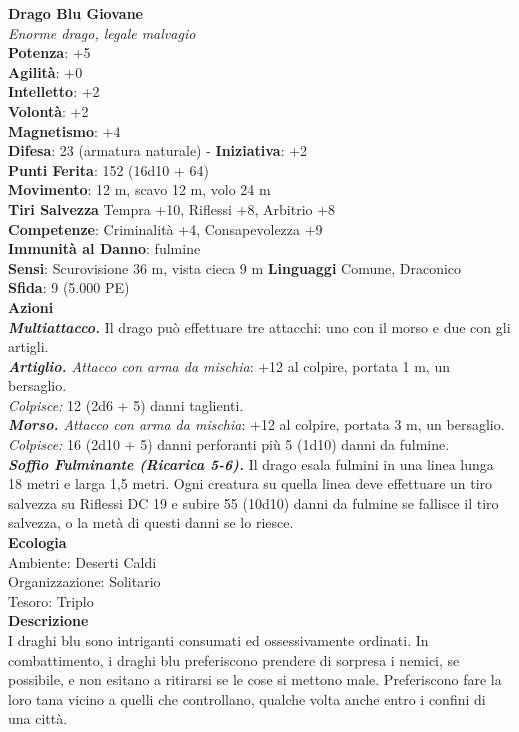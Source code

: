 \begin{multicols}{2}
\medskip\textbf{Drago Blu Giovane}\\
\emph{Enorme drago, legale malvagio}\\
\textbf{Potenza}: +5\\
\textbf{Agilità}: +0\\
\textbf{Intelletto}: +2\\
\textbf{Volontà}: +2\\
\textbf{Magnetismo}: +4\\
\textbf{Difesa}: 23 (armatura naturale) - \textbf{Iniziativa}: +2\\
\textbf{Punti Ferita}: 152 (16d10 + 64)\\
\textbf{Movimento}: 12 m, scavo 12 m, volo 24 m\\
\textbf{Tiri Salvezza} Tempra +10, Riflessi +8, Arbitrio +8\\
\textbf{Competenze}: Criminalità +4, Consapevolezza +9\\
\textbf{Immunità al Danno}: fulmine\\
\textbf{Sensi}: Scurovisione 36 m, vista cieca 9 m
\textbf{Linguaggi} Comune, Draconico\\
\textbf{Sfida}: 9 (5.000 PE)\smallskip\\
\smallskip\textbf{Azioni}\\
\emph{\textbf{Multiattacco.}} Il drago può effettuare tre attacchi: uno con il morso e due con gli artigli.\\
\emph{\textbf{Artiglio.} Attacco con arma da mischia}: +12 al colpire, portata 1 m, un bersaglio.\\
\emph{Colpisce:} 12 (2d6 + 5) danni taglienti.\\
\emph{\textbf{Morso.} Attacco con arma da mischia}: +12 al colpire, portata 3 m, un bersaglio.\\
\emph{Colpisce:} 16 (2d10 + 5) danni perforanti più 5 (1d10) danni da fulmine.\\
\emph{\textbf{Soffio Fulminante (Ricarica 5-6).}} Il drago esala fulmini in una linea lunga 18 metri e larga 1,5 metri. Ogni creatura su quella linea deve effettuare un tiro salvezza su Riflessi DC  19 e subire 55 (10d10) danni da fulmine se fallisce il tiro salvezza, o la metà di questi danni se lo riesce.\\
\textbf{Ecologia}\\
Ambiente: Deserti Caldi\\
Organizzazione: Solitario\\
Tesoro: Triplo\\
\textbf{Descrizione}\\
I draghi blu sono intriganti consumati ed ossessivamente ordinati. In combattimento, i draghi blu preferiscono prendere di sorpresa i nemici, se possibile, e non esitano a ritirarsi se le cose si mettono male. Preferiscono fare la loro tana vicino a quelli che controllano, qualche volta anche entro i confini di una città.\\



\end{multicols}
